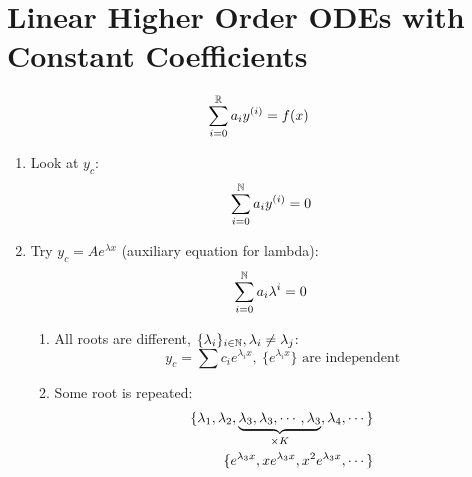 \documentclass[Maths.tex]{subfiles}
\begin{document}
\section{Linear Higher Order ODEs with Constant Coefficients}
\begin{equation}
    \sum_{i = 0}^{\mathbb{R}} a_i y^{(i)} = f(x)
\end{equation}
\begin{enumerate}
    \item Look at $y_c$:
        \begin{equation}
            \sum_{i=0}^{\mathbb{N}} a_i y^{(i)} = 0
        \end{equation}
    \item Try $y_c = Ae^{\lambda x}$ (auxiliary equation for lambda):
        \begin{equation}
            \sum_{i=0}^{\mathbb{N}} a_i \lambda^i = 0
        \end{equation}
    \begin{enumerate}
        \item All roots are different, $\{\lambda_i\}_{i \in \mathbb{N}}, \lambda_i \neq \lambda_j$:
            \begin{equation}
                y_c = \sum c_i e^{\lambda_i x}, ~ \{e^{\lambda_i x}\}\text{ are independent}
            \end{equation}
        \item Some root is repeated:
            \begin{align}
                \{\lambda_1,\lambda_2,\underbrace{\lambda_3,\lambda_3,\cdots,\lambda_3}_{\times K},\lambda_4,\cdots\} \\
                \{e^{\lambda_3 x},xe^{\lambda_3 x},x^2e^{\lambda_3 x},\cdots\}
            \end{align}
    \end{enumerate}
\end{enumerate}
\end{document}
